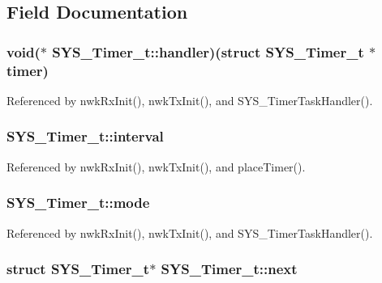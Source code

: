 \subsection{Field Documentation}
\hypertarget{struct_s_y_s___timer__t_a8d8270580165042de9b09efeb887173d}{
\subsubsection[{handler}]{\setlength{\rightskip}{0pt plus 5cm}void($\ast$ S\-Y\-S\-\_\-\-Timer\-\_\-t\-::handler)(struct {\bf S\-Y\-S\-\_\-\-Timer\-\_\-t} $\ast$timer)}}\label{struct_s_y_s___timer__t_a8d8270580165042de9b09efeb887173d}


Referenced by nwk\-Rx\-Init(), nwk\-Tx\-Init(), and S\-Y\-S\-\_\-\-Timer\-Task\-Handler().

\hypertarget{struct_s_y_s___timer__t_ac24aa7287900cd8b87e9f45bccd0b6ae}{
\subsubsection[{interval}]{ S\-Y\-S\-\_\-\-Timer\-\_\-t\-::interval}}\label{struct_s_y_s___timer__t_ac24aa7287900cd8b87e9f45bccd0b6ae}


Referenced by nwk\-Rx\-Init(), nwk\-Tx\-Init(), and place\-Timer().

\hypertarget{struct_s_y_s___timer__t_ab992b241678bdcf98275a5de6ad81c5d}{
\subsubsection[{mode}]{ S\-Y\-S\-\_\-\-Timer\-\_\-t\-::mode}}\label{struct_s_y_s___timer__t_ab992b241678bdcf98275a5de6ad81c5d}


Referenced by nwk\-Rx\-Init(), nwk\-Tx\-Init(), and S\-Y\-S\-\_\-\-Timer\-Task\-Handler().

\hypertarget{struct_s_y_s___timer__t_af0da9cf144fe36ac5e1da4a528121820}{
\subsubsection[{next}]{\setlength{\rightskip}{0pt plus 5cm}struct {\bf S\-Y\-S\-\_\-\-Timer\-\_\-t}$\ast$ S\-Y\-S\-\_\-\-Timer\-\_\-t\-::next}}\label{struct_s_y_s___timer__t_af0da9cf144fe36ac5e1da4a528121820}


